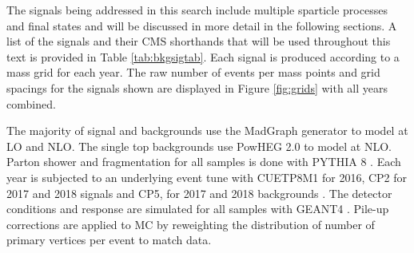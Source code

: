 The signals being addressed in this search include multiple sparticle processes and final states and will be discussed in more detail in the following sections. A list of the signals and their CMS shorthands that will be used throughout this text is provided in Table \ref{tab:bkgsigtab}. Each signal is produced according to a mass grid for each year.  The raw number of events per mass points and grid spacings for the signals shown are displayed in Figure \ref{fig:grids} with all years combined. 


The majority of signal and backgrounds use the MadGraph \cite{Alwall:2011uj} generator to model at LO and NLO. The single top backgrounds use PowHEG 2.0 \cite{Alioli:2010xd} to model at NLO. Parton shower and fragmentation for all samples is done with PYTHIA 8 \cite{Sjostrand:2014zea}. Each year is subjected to an underlying event tune with CUETP8M1 for 2016, CP2 for 2017 and 2018 signals and CP5, for 2017 and 2018 backgrounds \cite{CMS:2015wcf}\cite{CMS:2019csb}. The detector conditions and response are simulated for all samples with GEANT4 \cite{GEANT4:2002zbu}. Pile-up corrections are applied to MC by reweighting the distribution of number of primary vertices per event to match data.

